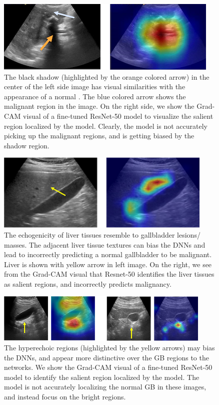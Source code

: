 \begin{figure}[t]
    \centering
    \includegraphics[width=0.8\linewidth]{figs/shadow_bias.png}
    \caption[Visualization of issues arising from artifacts such as acoustic shadow]{The black shadow (highlighted by the orange colored arrow) in the center of the left side image has visual similarities with the appearance of a normal \gb. The blue colored arrow shows the malignant region in the image. On the right side, we show the Grad-CAM \cite{gradcam} visual of a fine-tuned ResNet-50 \cite{resnet} model to visualize the salient region localized by the model. Clearly, the model is not accurately picking up the malignant regions, and is getting biased by the shadow region.}
    \label{fig:shadow_bias}
\end{figure}

\begin{figure}[t]
    \centering
    \includegraphics[width=0.8\linewidth, height=10em]{figs/texture_bias.png}
    \caption[Textures of liver tissues leading to incorrect GBC predictions]{The echogenicity of liver tissues resemble to gallbladder lesions/ masses. The adjacent liver tissue textures can bias the DNNs and lead to incorrectly predicting a normal gallbladder to be malignant. Liver is shown with yellow arrow in left image. On the right, we see from the Grad-CAM visual that Resnet-50 identifies the liver tissues as salient regions, and incorrectly predicts malignancy.}
    \label{fig:texture_bias}
\end{figure}

\begin{figure}[!ht]
    \centering
    \includegraphics[width=0.8\linewidth]{figs/bright.png}
    \caption[Visualization of DNN models getting biased by hyperechoic regions]{The hyperechoic regions (highlighted by the yellow arrows) may bias the DNNs, and appear more distinctive over the GB regions to the networks. We show the Grad-CAM visual of a fine-tuned ResNet-50 model to identify the salient region localized by the model. The model is not accurately localizing the normal GB in these images, and instead focus on the bright regions.}
    \label{fig:hyperechoic_bias}
\end{figure}

